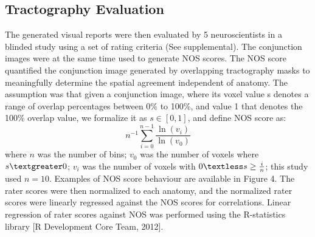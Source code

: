 \subsection{Tractography Evaluation}
The generated visual reports were then evaluated by 5 neuroscientists in a blinded study using a set of rating criteria (See supplemental). The conjunction images were at the same time used to generate NOS scores. The NOS score quantified the conjunction image generated by overlapping tractography masks to meaningfully determine the spatial agreement independent of anatomy. The assumption was that given a conjunction image, where its voxel value s denotes a range of overlap percentages between 0\% to 100\%, and value 1 that denotes the 100\% overlap value, we formalize it as $ s\in[0,1]$, and define NOS score as: 
\begin{equation}
n^{-1} \sum_{i=0}^{n-1} \frac{\ln(v_i)}{\ln(v_0)}
\end{equation}
where $n$ was the number of bins; $v_0$ was the number of voxels where $s \textgreater 0$;  $v_i$ was the number of voxels with $ 0 \textless s \ge \frac{i}{n}$; this study used $n=10$. Examples of NOS score behaviour are available in Figure 4. 
The rater scores were then normalized to each anatomy, and the normalized rater scores were linearly regressed against the NOS scores for correlations. Linear regression of rater scores against NOS was performed using the R-statistics library [R Development Core Team, 2012]. 


